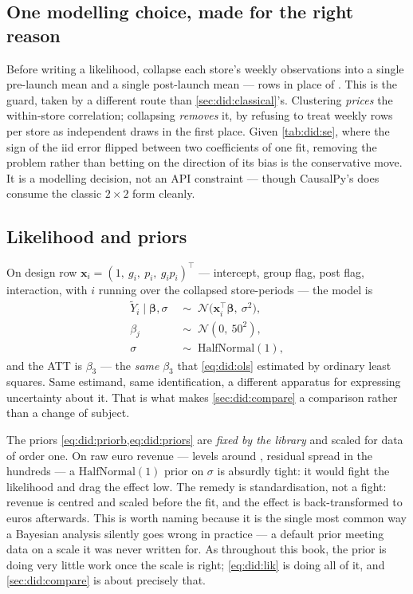 \subsection*{One modelling choice, made for the right reason}

Before writing a likelihood, collapse each store's \nbEightNWeeks{} weekly observations into a
single pre-launch mean and a single post-launch mean --- \nbEightNCollapsed{} rows in place of
\nbEightNObs. This is the \citet{bertrand2004} guard, taken by a different route than
\cref{sec:did:classical}'s. Clustering \emph{prices} the within-store correlation; collapsing
\emph{removes} it, by refusing to treat \nbEightNWeeks{} weekly rows per store as \nbEightNWeeks{}
independent draws in the first place. Given \cref{tab:did:se}, where the sign of the iid error
flipped between two coefficients of one fit, removing the problem rather than betting on the
direction of its bias is the conservative move. It is a modelling decision, not an API constraint
--- though CausalPy's  \citep{causalpy} does consume the classic
$2 \times 2$ form cleanly.

\subsection*{Likelihood and priors}

On design row $\mathbf x_i = (1,\ g_i,\ p_i,\ g_i p_i)^\top$ --- intercept, group flag, post flag,
interaction, with $i$ running over the \nbEightNCollapsed{} collapsed store-periods --- the model is
%
\begin{align}
  \tilde Y_i \mid \boldsymbol\beta, \sigma
    &\;\sim\; \mathcal N\!\big(\mathbf x_i^\top \boldsymbol\beta,\ \sigma^{2}\big),
    \label{eq:did:lik}\\
  \beta_j &\;\sim\; \mathcal N(0,\ 50^{2}), \label{eq:did:priorb}\\
  \sigma &\;\sim\; \text{HalfNormal}(1), \label{eq:did:priors}
\end{align}
%
and the ATT is $\beta_3$ --- the \emph{same} $\beta_3$ that \cref{eq:did:ols} estimated by ordinary
least squares. Same estimand, same identification, a different apparatus for expressing uncertainty
about it. That is what makes \cref{sec:did:compare} a comparison rather than a change of subject.

The priors \cref{eq:did:priorb,eq:did:priors} are \emph{fixed by the library} and scaled for data of
order one. On raw euro revenue --- levels around , residual spread in the hundreds --- a
$\text{HalfNormal}(1)$ prior on $\sigma$ is absurdly tight: it would fight the likelihood and drag
the effect low. The remedy is standardisation, not a fight: revenue is centred and scaled before
the fit, and the effect is back-transformed to euros afterwards. This is worth naming because it is
the single most common way a Bayesian analysis silently goes wrong in practice --- a default prior
meeting data on a scale it was never written for. As throughout this book, the prior is doing very
little work once the scale is right; \cref{eq:did:lik} is doing all of it, and
\cref{sec:did:compare} is about precisely that.

